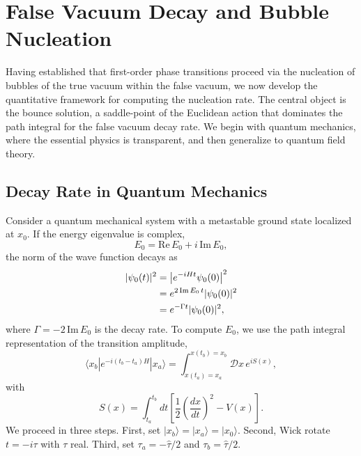 \chapter{False Vacuum Decay and Bubble Nucleation}
\label{ch:vacuum-decay}

Having established that first-order phase transitions proceed via the
nucleation of bubbles of the true vacuum within the false vacuum, we
now develop the quantitative framework for computing the nucleation
rate. The central object is the bounce solution, a saddle-point of the
Euclidean action that dominates the path integral for the false vacuum
decay rate. We begin with quantum mechanics, where the essential
physics is transparent, and then generalize to quantum field theory.

\section{Decay Rate in Quantum Mechanics}

Consider a quantum mechanical system with a metastable ground state
localized at $x_0$. If the energy eigenvalue is complex,
\begin{equation}
	E_0 = \text{Re}\,E_0 + i\,\text{Im}\,E_0,
\end{equation}
the norm of the wave function decays as
\begin{align}
	|\psi_0(t)|^2 & = \left|e^{-iHt}\psi_0(0)\right|^2 \notag      \\
	              & = e^{2\,\text{Im}\,E_0\,t}|\psi_0(0)|^2 \notag \\
	              & = e^{-\Gamma t}|\psi_0(0)|^2,
\end{align}
where $\Gamma = -2\,\text{Im}\,E_0$ is the decay rate. To compute
$E_0$, we use the path integral representation of the transition
amplitude,
\begin{equation}
	\langle x_b|e^{-i(t_b-t_a)H}|x_a\rangle
	= \int_{x(t_a)=x_a}^{x(t_b)=x_b}\mathcal{D}x\,e^{iS(x)},
	\label{eq:tr_amp}
\end{equation}
with
\begin{equation}
	S(x) = \int_{t_a}^{t_b}dt\left[
		\frac{1}{2}\left(\frac{dx}{dt}\right)^2 - V(x)\right].
\end{equation}
We proceed in three steps. First, set $|x_b\rangle = |x_a\rangle =
	|x_0\rangle$. Second, Wick rotate $t = -i\tau$ with $\tau$ real.
Third, set $\tau_a = -\hat\tau/2$ and $\tau_b = \hat\tau/2$.

